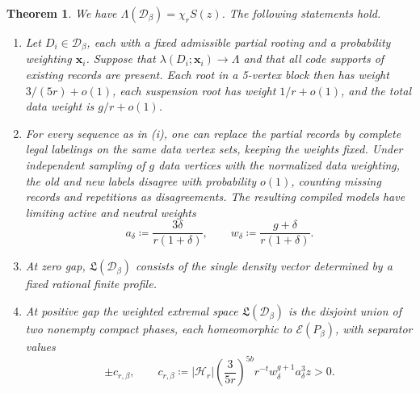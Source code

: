 \documentclass[10pt]{article}
\numberwithin{equation}{section}
\newtheorem{theorem}{Theorem}[section]
\theoremstyle{definition}
\newcommand{\cD}{\mathcal D}\newcommand{\cE}{\mathcal E}\newcommand{\cF}{\mathcal F}
\newcommand{\x}{\boldsymbol{x}}\newcommand{\y}{\boldsymbol{y}}
\begin{document}
\begin{theorem}\label{thm:loss}
We have $\Lambda(\cD_\beta)=\chi_rS(z)$. The following statements hold.
\begin{enumerate}[beginpenalty=10000]
\item Let $D_i\in\cD_\beta$, each with a fixed admissible partial rooting and a probability weighting $\x_i$. Suppose that $\lambda(D_i;\x_i)\to\Lambda$ and that all code supports of existing records are present. Each root in a 5-vertex block then has weight $3/(5r)+o(1)$, each suspension root has weight $1/r+o(1)$, and the total data weight is $g/r+o(1)$.
\item For every sequence as in \textup{(i)}, one can replace the partial records by complete legal labelings on the same data vertex sets, keeping the weights fixed. Under independent sampling of $g$ data vertices with the normalized data weighting, the old and new labels disagree with probability $o(1)$, counting missing records and repetitions as disagreements. The resulting compiled models have limiting active and neutral weights
\begin{equation}\label{eq:optimalmasses}
 a_\delta\coloneqq\frac{3\delta}{r(1+\delta)},\qquad
 w_\delta\coloneqq\frac{g+\delta}{r(1+\delta)}.
\end{equation}
\item At zero gap, $\mathfrak L(\cD_\beta)$ consists of the single density vector determined by a fixed rational finite profile.
\item At positive gap the weighted extremal space $\mathfrak L(\cD_\beta)$ is the disjoint union of two nonempty compact phases, each homeomorphic to $\cE(P_\beta)$, with separator values
\begin{equation}\label{eq:sepconstant}
 \pm c_{r,\beta},\qquad
 c_{r,\beta}\coloneqq |\mathscr H_r|\left(\frac{3}{5r}\right)^{5b}r^{-t}
                     w_\delta^{g+1}a_\delta^3 z>0.
\end{equation}
\end{enumerate}
\end{theorem}
\end{document}
